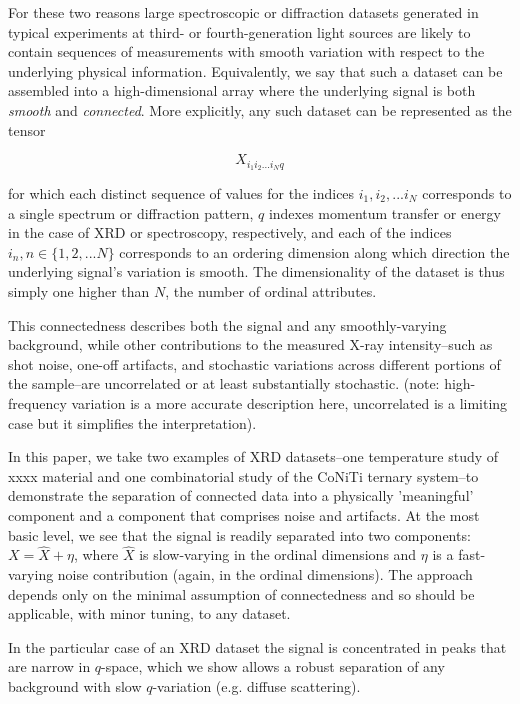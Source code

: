 \documentclass[12pt]{iopart}
\begin{document}

For these two reasons large spectroscopic or diffraction datasets generated in typical experiments at third- or fourth-generation light sources are likely to contain sequences of measurements with smooth variation with respect to the underlying physical information. Equivalently, we say that such a dataset can be assembled into a high-dimensional array where the underlying signal is both \emph{smooth} and \emph{connected}. More explicitly, any such dataset can be represented as the tensor

\begin{equation}
X_{i_1i_2...i_Nq}
\end{equation}

for which each distinct sequence of values for the indices $i_1, i_2,...
i_N$ corresponds to a single spectrum or diffraction pattern, $q$
indexes momentum transfer or energy in the case of XRD or spectroscopy,
respectively, and each of the indices $i_n, n \in \{1, 2, ... N\}$
corresponds to an ordering dimension along which direction the
underlying signal's variation is smooth. The dimensionality of the
dataset is thus simply one higher than $N$, the number of ordinal
attributes.


This connectedness describes both the signal and any smoothly-varying
background, while other contributions to the measured X-ray
intensity--such as shot noise, one-off artifacts, and stochastic
variations across different portions of the sample--are uncorrelated or
at least substantially stochastic. (note: high-frequency variation is a
more accurate description here, uncorrelated is a limiting case but it
simplifies the interpretation).

In this paper, we take two examples of XRD datasets--one temperature
study of xxxx material and one combinatorial study of the CoNiTi
ternary system--to demonstrate the separation of connected data into
a physically 'meaningful' component and a component that comprises
noise and artifacts. At the most basic level, we see that the signal
is readily separated into two components: $X = \hat{X} + \eta$, where
$\hat{X}$ is slow-varying in the ordinal dimensions and $\eta$ is a fast-varying noise
contribution (again, in the ordinal dimensions). The approach depends only on the minimal assumption of
connectedness and so should be applicable, with minor tuning, to any
dataset.

In the particular case of an XRD dataset the signal is concentrated in peaks that are narrow in $q$-space, which we show allows a robust separation of any background with slow $q$-variation (e.g. diffuse scattering). 
\end{document}
